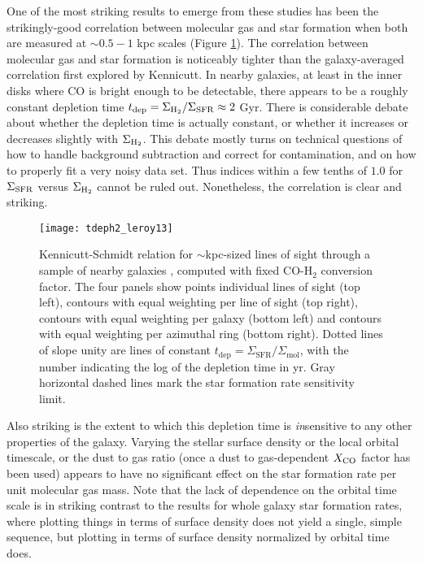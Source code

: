One of the most striking results to emerge from these studies has been the strikingly-good correlation between molecular gas and star formation when both are measured at $\sim 0.5-1$ kpc scales (Figure \ref{fig:tdeph2_leroy13}). The correlation between molecular gas and star formation is noticeably tighter than the galaxy-averaged correlation first explored by Kennicutt. In nearby galaxies, at least in the inner disks where CO is bright enough to be detectable, there appears to be a roughly constant depletion time $t_{\rm dep} = \Sigma_{\rm H_2}/\Sigma_{\rm SFR} \approx 2$ Gyr. There is considerable debate about whether the depletion time is actually constant, or whether it increases or decreases slightly with $\Sigma_{\rm H_2}$. This debate mostly turns on technical questions of how to handle background subtraction and correct for contamination, and on how to properly fit a very noisy data set. Thus indices within a few tenths of $1.0$ for $\Sigma_{\rm SFR}$ versus $\Sigma_{\rm H_2}$ cannot be ruled out. Nonetheless, the correlation is clear and striking.

\begin{figure}
\texttt{[image: tdeph2\_leroy13]}
\caption[Kennicutt-Schmidt relation for galaxies resolved at $\sim$kpc scales]{
\label{fig:tdeph2_leroy13}
Kennicutt-Schmidt relation for $\sim$kpc-sized lines of sight through a sample of nearby galaxies \citep{leroy13a}, computed with fixed CO-H$_2$ conversion factor. The four panels show points individual lines of sight (top left), contours with equal weighting per line of sight (top right), contours with equal weighting per galaxy (bottom left) and contours with equal weighting per azimuthal ring (bottom right). Dotted lines of slope unity are lines of constant $t_{\mathrm{dep}} = \Sigma_{\mathrm{SFR}} / \Sigma_{\mathrm{mol}}$, with the number indicating the log of the depletion time in yr. Gray horizontal dashed lines mark the star formation rate sensitivity limit.
}
\end{figure}

Also striking is the extent to which this depletion time is \textit{in}sensitive to any other properties of the galaxy.  Varying the stellar surface density or the local orbital timescale, or the dust to gas ratio (once a dust to gas-dependent $X_{\rm CO}$ factor has been used) appears to have no significant effect on the star formation rate per unit molecular gas mass. Note that the lack of dependence on the orbital time scale is in striking contrast to the results for whole galaxy star formation rates, where plotting things in terms of surface density does not yield a single, simple sequence, but plotting in terms of surface density normalized by orbital time does.

